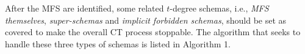 \documentclass{sig-alternate}
\begin{document}
%


After the MFS are identified, some related $t$-degree schemas, i.e., \emph{MFS themselves}, \emph{super-schemas} and \emph{implicit forbidden schemas}, should be set as covered to make the overall CT process stoppable. The algorithm that seeks to handle these three types of schemas is listed in Algorithm 1.
\end{document}
